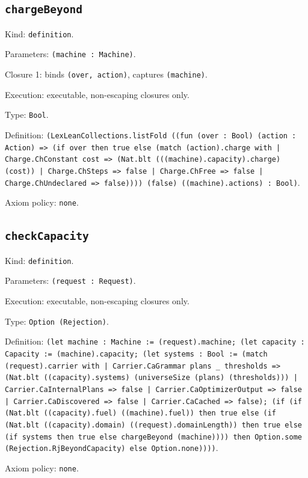 \documentclass[11pt]{article}
\begin{document}
\subsection*{\texttt{chargeBeyond}}
\noindent Kind: \texttt{definition}.\par
\noindent Parameters: \texttt{(machine : Machine)}.\par
\noindent Closure 1: binds \texttt{(over, action)}, captures \texttt{(machine)}.\par
\noindent Execution: executable, non-escaping closures only.\par
\noindent Type: \texttt{Bool}.\par
\noindent Definition: \texttt{(LexLeanCollections.listFold ((fun (over : Bool) (action : Action) => (if over then true else (match (action).charge with | Charge.ChConstant cost => (Nat.blt (((machine).capacity).charge) (cost)) | Charge.ChSteps => false | Charge.ChFree => false | Charge.ChUndeclared => false)))) (false) ((machine).actions) : Bool)}.\par
\noindent Axiom policy: \texttt{none}.\par
\subsection*{\texttt{checkCapacity}}
\noindent Kind: \texttt{definition}.\par
\noindent Parameters: \texttt{(request : Request)}.\par
\noindent Execution: executable, non-escaping closures only.\par
\noindent Type: \texttt{Option (Rejection)}.\par
\noindent Definition: \texttt{(let machine : Machine := (request).machine; (let capacity : Capacity := (machine).capacity; (let systems : Bool := (match (request).carrier with | Carrier.CaGrammar plans \_ thresholds => (Nat.blt ((capacity).systems) (universeSize (plans) (thresholds))) | Carrier.CaInternalPlans => false | Carrier.CaOptimizerOutput => false | Carrier.CaDiscovered => false | Carrier.CaCached => false); (if (if (Nat.blt ((capacity).fuel) ((machine).fuel)) then true else (if (Nat.blt ((capacity).domain) ((request).domainLength)) then true else (if systems then true else chargeBeyond (machine)))) then Option.some (Rejection.RjBeyondCapacity) else Option.none))))}.\par
\noindent Axiom policy: \texttt{none}.\par
\end{document}
